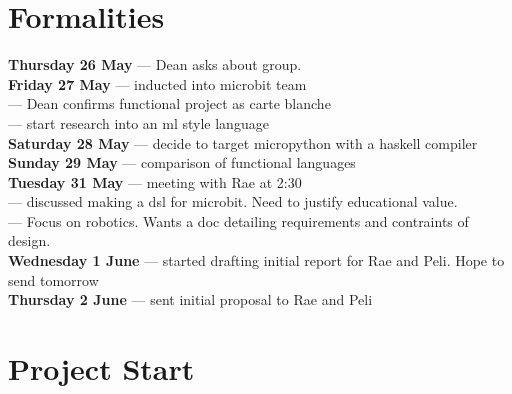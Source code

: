 \section{Formalities} 

\textbf{Thursday 26 May}  --- Dean asks about group.  \\
\textbf{Friday 27 May}  --- inducted into microbit team \\
               --- Dean confirms functional project as carte blanche \\
--- start research into an ml style language \\
\textbf{Saturday 28 May}  --- decide to target micropython with a haskell compiler \\
\textbf{Sunday 29 May}  --- comparison of functional languages \\
\textbf{Tuesday 31 May}  --- meeting with Rae at 2:30 \\
\textbf{}  --- discussed making a dsl for microbit. Need to justify educational value. \\
\textbf{}  --- Focus on robotics. Wants a doc detailing requirements and contraints of design. \\
\textbf{Wednesday 1 June}  --- started drafting initial report for Rae and Peli. Hope to send tomorrow \\
\textbf{Thursday 2 June}  --- sent initial proposal to Rae and Peli \\

\section{Project Start} 

